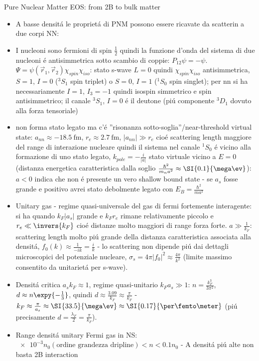 \begin{frame}{Pure Nuclear Matter EOS: from 2B to bulk matter}
            \begin{itemize}
                \item A basse densit\'a le propriet\'a di PNM possono essere ricavate da scatterin a due corpi NN:
                \item I nucleoni sono fermioni di spin $\frac{1}{2}$ quindi la funzione d'onda del sistema di due nucleoni \'e antisimmetrica sotto scambio di coppie: $P_{12}\psi=-\psi$. $\Psi=\psi(\vec{r}_1,\vec{r}_2)\chi_{spin}\chi_{iso}$: stato s-wave $L=0$ quindi $\chi_{spin}\chi_{iso}$ antisimmetrica, $S=1$, $I=0$ ($^3S_1$ spin triplet) o $S=0$, $I=1$ ($^1S_0$ spin singlet); per nn si ha necessariamente $I=1$, $I_3=-1$ quindi isospin simmetrico e spin antisimmetrico; il canale $^3S_1$, $I=0$ \'e il deutone \Pproton\Pneutron (pi\'u componente $^3D_1$ dovuto alla forza tensoriale)
                \item \Pneutron\Pneutron non forma stato legato ma c'\'e ''risonanza sotto-soglia''/near-threshold virtual state: $a_{nn}\approx-\SI{18.5}{\femto\meter}$, $r_e\approx\SI{2.7}{\femto\meter}$, $|a_{nn}|\gg r_e$ cio\'e scattering length maggiore del range di interazione nucleare quindi il sistema \Pneutron\Pneutron nel canale $^1S_0$ \'e vicino alla formazione di uno stato legato, $k_{pole}=-\frac{i}{|a|}$ stato virtuale vicino a $E=0$ (distanza energetica caratteristica dalla soglio $\frac{\hbar^2}{m_na^2}\approx\SI{0.1}{\mega\ev}$): $a<0$ indica che non \'e presente un vero shallow bound state - se $a_s$ fosse grande e positivo avrei stato debolmente legato con $E_B=\frac{\hbar^2}{ma^2}$
                \item Unitary gas - regime quasi-universale del gas di fermi fortemente interagente: si ha quando $k_F|a_s|$ grande e $k_Fr_e$ rimane relativamente piccolo e $r_e\ll\invers{k_F}$ cio\'e distanze molto maggiori di range forza forte. $a\gg \frac{1}{k_F}$: scattering length molto pi\'u grande della distanza caratteristica associata alla densit\'a, $f_0(k)\approx \frac{1}{-ik}=\frac{i}{k}$ - lo scattering non dipende pi\'u dai dettagli microscopici del potenziale nucleare, $\sigma_s=4\pi|f_0|^2\approx \frac{4\pi}{k^2}$ (limite massimo consentito da unitariet\'a per s-wave).
                \item Densit\'a critica $a_sk_F\approx1$, regime quasi-unitario $k_Fa_s\gg1$: $n=\frac{k_F^3}{3\pi^2}$, $d\approx n\expy{-\frac{1}{3}}$, quindi $d\approx \frac{3.09}{k_F}\approx \frac{\pi}{k_F}$ - $k_F\approx \frac{\pi}{a_s}\approx\SI{33.5}{\mega\ev}\approx\SI{0.17}{\per\femto\meter}$ (pi\'u precisamente $d=\frac{\lambda_F}{2}=\frac{\pi}{k_F}$).
                \item Range densit\'a unitary Fermi gas in NS: $\num{e-3}n_0(\text{ordine grandezza dripline})<n<0.1n_0$ - A densit\'a pi\'u alte non basta 2B interaction
            \end{itemize}
\end{frame}

